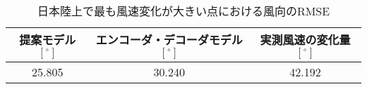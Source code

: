 \begin{table}[bp]
  \caption{日本陸上で最も風速変化が大きい点における風向のRMSE}
  \label{table:exp-max-diff-point-direction}
  \centering
  \begin{tabular}{ccc}
    \hline
    提案モデル $\mathrm{[^\circ]}$ & エンコーダ・デコーダモデル $\mathrm{[^\circ]}$ & 実測風速の変化量 $\mathrm{[^\circ]}$ \\
    \hline
    25.805 & 30.240 & 42.192 \\
    \hline
  \end{tabular}
\end{table}

